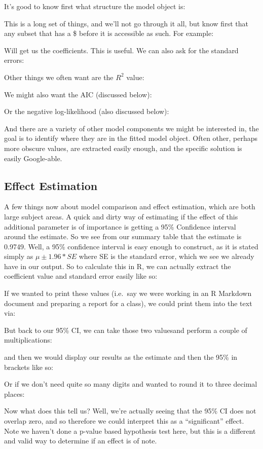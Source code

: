 \documentclass[
]{article}
\begin{document}
It's good to know first what structure the model object is:

This is a long set of things, and we'll not go through it all, but know
first that any subset that has a \$ before it is accessible as such. For
example:

Will get us the coefficients. This is useful. We can also ask for the
standard errors:

Other things we often want are the \(R^2\) value:

We might also want the AIC (discussed below):

Or the negative log-likelihood (also discussed below):

And there are a variety of other model components we might be interested
in, the goal is to identify where they are in the fitted model object.
Often other, perhaps more obscure values, are extracted easily enough,
and the specific solution is easily Google-able.

\hypertarget{effect-estimation}{%
\subsection{Effect Estimation}\label{effect-estimation}}

A few things now about model comparison and effect estimation, which are
both large subject areas. A quick and dirty way of estimating if the
effect of this additional parameter is of importance is getting a 95\%
Confidence interval around the estimate. So we see from our summary
table that the estimate is 0.9749. Well, a 95\% confidence interval is
easy enough to construct, as it is stated simply as
\(\mu \pm 1.96 * SE\) where SE is the standard error, which we see we
already have in our output. So to calculate this in R, we can actually
extract the coefficient value and standard error easily like so:

If we wanted to print these values (i.e.~say we were working in an R
Markdown document and preparing a report for a class), we could print
them into the text via:

But back to our 95\% CI, we can take those two valuesand perform a
couple of multiplications:

and then we would display our results as the estimate and then the 95\%
in brackets like so:

Or if we don't need quite so many digits and wanted to round it to three
decimal places:

Now what does this tell us? Well, we're actually seeing that the 95\% CI
does not overlap zero, and so therefore we could interpret this as a
``significant'' effect. Note we haven't done a p-value based hypothesis
test here, but this is a different and valid way to determine if an
effect is of note.
\end{document}
